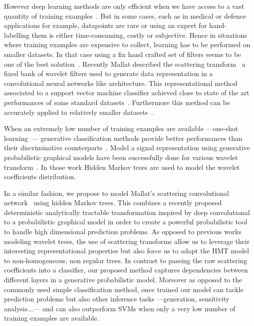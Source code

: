 \documentclass{article}
\begin{document}
  However deep learning methods are only efficient when we have access to a vast quantity of training examples~\cite{glorot2010understanding}. But in some cases, such as in medical or defence applications for example, datapoints are rare or using an expert for hand-labelling them is either time-consuming, costly or subjective. Hence in situations where training examples are expensive to collect, learning has to be performed on smaller datasets. In that case using a fix hand crafted set of filters seems to be one of the best solution~\cite{hsiang2001embedded}. Recently Mallat described the scattering transform~\cite{mallat2012gis} a fixed bank of wavelet filters used to generate data representation in a convolutional neural networks like architecture. This representational method associated to a support vector machine classifier achieved close to state of the art performances of some standard datasets~\cite{bruna2010classification}. Furthermore this method can be accurately applied to relatively smaller datasets~\cite{sifre2013rotation}.

  When an extremely low number of training examples are available ---one-shot learning~\cite{fei2006one}--- generative classification methods provide better performances than their discriminative counterparts~\cite{jordan2002discriminative}. Model a signal representation using generative probabilistic graphical models have been successfully done for various wavelet transform~\cite{crouse1998wavelet, kingsbury2001complex}. In those work Hidden Markov trees are used to model the wavelet coefficients distribution. 
  
  In a similar fashion, we propose to model Mallat's scattering convolutional network~\cite{bruna2010classification} using hidden Markov trees. This combines a recently proposed deterministic analytically tractable transformation inspired by deep convolutional to a probabilistic graphical model in order to create a powerful probabilistic tool to handle high dimensional prediction problems. As opposed to previous works modeling wavelet trees, the use of scattering transforms allow us to leverage their interesting representational properties but also force us to adapt the HMT model to non-homogeneous, non regular trees. In contrast to passing the raw scattering coefficients into a classifier, our proposed method captures dependencies between different layers in a generative probabilistic model. Moreover as opposed to the commonly used simple classification method, once trained our model can tackle prediction problems but also other inference tasks ---\eg generation, sensitivity analysis...--- and can also outperform SVMs when only a very low number of training examples are available.
\end{document}
